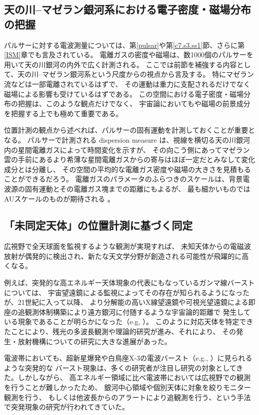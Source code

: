 
\setcounter{subsection}{4}\subsection{天の川--マゼラン銀河系における電子密度・磁場分布の把握}\label{c7.s4.ss5}

パルサーに対する電波測量については、第\ref{pulsar}や第\ref{c7.s3.ss1}節、さらに第\ref{ISM}章でも言及されている。
電離ガスの密度や磁場は、数1000個のパルサーを用いて天の川銀河の内外で広く計測される。
ここでは前節を補強する内容として、天の川--マゼラン銀河系という尺度からの視点から言及する。
特にマゼラン流などは一部電離されているはずで、
その運動は重力に支配されるだけでなく磁場による影響も受けているはずである。
この空間における電子密度・磁場分布の把握は、このような観点だけでなく、
宇宙論においてもや磁場の前景成分を把握する上でも極めて重要である。

位置計測の観点から述べれば、パルサーの固有運動を計測しておくことが重要となる。
パルサーで計測される dispersion measure は、視線を横切る天の川銀河内の星間電離ガスによって時間変化を示すが、
その向こう側にあってマゼラン雲の手前にあるより希薄な星間電離ガスからの寄与はほぼ一定だとみなして変化成分とは分離し、
その空間の平均的な電離ガス密度や磁場の大きさを見積もることができるだろう。
電離ガスのパラメータのふらつきのスケールは、背景電波源の固有運動とその電離ガス塊までの距離にもよるが、
最も細かいものではAUスケールのものが期待される\citep{2003ASPC..306..383J} 。

\setcounter{subsection}{5}\subsection{「未同定天体」の位置計測に基づく同定}\label{c7.s4.ss6}

広視野で全天球面を監視するような観測が実現すれば、
未知天体からの電磁波放射が偶発的に検出され、新たな天文学分野が創造される可能性が飛躍的に高くなる。

例えば、突発的な高エネルギー天体現象の代表にもなっているガンマ線バーストについては、
宇宙望遠鏡による監視によってその存在が知られるようになったが、21世紀に入って以降、
より分解能の高いX線望遠鏡や可視光望遠鏡による即座の追観測体制構築により遠方銀河に付随するような宇宙論的距離で
発生している現象であることが明らかになった（e.g, \citealt{2006Natur.440..184K}）。
このように対応天体を特定できたことにより、残光の多波長観測や理論的研究が進み、それにより、
その発生・放射機構についての研究に大きな進展があった。

電波帯においても、超新星爆発や白鳥座X-3の電波バースト（e.g., \citealt{1972Natur.239..440G}）に見られるような突発的な
バースト現象は、多くの研究者が注目し研究の対象としてきた。しかしながら、
高エネルギー領域に比べ電波帯においては広視野での観測を行うことが難しかったため、
銀河中心領域や個別天体に対象を絞りモニター観測を行う、
もしくは他波長からのアラートにより追観測を行う、という手法で突発現象の研究が行われてきていた。

